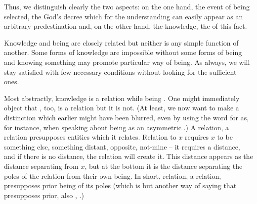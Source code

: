 Thus, we distinguish clearly the two aspects: on the one hand, the
 event of being selected, the God's decree which for the
 understanding can easily appear as an arbitrary predestination
and, on the other hand, the  knowledge, the 
 of this fact.

\pa\label{pa:beKnow}
Knowledge and being are closely related but neither is any simple function
of another. Some forms of knowledge are impossible
without some forms of being and knowing something may promote particular
way of being. As always, we will stay satisfied with few
necessary conditions without looking for the sufficient ones. 

Most abstractly, knowledge is a relation while being . One
might immediately object that , too, is a relation but it is
not. (At least, we now want to make a distinction which earlier might have been
blurred, even by using the word  for  as, for
instance, when speaking about being as an asymmetric .)  A
relation, a  relation  presupposes  entities
which it relates.  Relation to $x$ requires $x$ to be something else,
something distant, opposite, not-mine -- it requires a distance, and if
there is no distance, the relation will create it. This distance appears as the
distance separating  from $x$, but at the bottom it is the distance
separating the poles of the relation from their own being.  In short, relation, a
 relation, presupposes prior being of its poles (which is but
another way of saying that  presupposes prior, also
, .)

